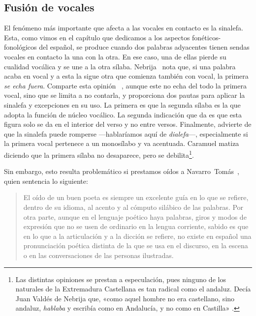 \subsection{Fusión de vocales}
El fenómeno más importante que afecta a las vocales en contacto es la sinalefa. Esta, como vimos en el capítulo que dedicamos a los aspectos fonéticos-fonológicos del español, se produce cuando dos palabras adyacentes tienen sendas vocales en contacto la una con la otra. En ese caso, una de ellas pierde su cualidad vocálica y se une a la otra sílaba. Nebrija~\parencite*[47]{nebrija1981} nota que, si una palabra acaba en vocal y a esta la sigue otra que comienza también con vocal, la primera \textit{se echa fuera}. Comparte esta opinión \citeauthor{diazrengifo2012}~\parencite*[186]{diazrengifo2012}, aunque este no echa del todo la primera vocal, sino que se limita a no contarla, y proporciona dos pautas para aplicar la sinalefa y excepciones en su uso. La primera es que la segunda sílaba es la que adopta la función de núcleo vocálico. La segunda indicación que da es que esta figura solo se da en el interior del verso y no entre versos. Finalmente, advierte de que la sinalefa puede romperse —hablaríamos aquí de \textit{dialefa}—, especialmente si la primera vocal pertenece a un monosílabo y va acentuada. Caramuel \parencite*[51]{caramuel2007} matiza diciendo que la primera sílaba no desaparece, pero se debilita\footnote{Las distintas opiniones se prestan a especulación, pues ninguno de los naturales de la Extremadura Castellana es tan radical como el andaluz. Decía Juan Valdés de Nebrija que, «como aquel hombre no era castellano, sino andaluz, \textit{hablaba} y escribía como en Andalucía, y no como en Castilla» \parencite[p. 190; énfasis añadido; ortografía modernizada]{valdes2015}.}.  

Sin embargo, esto resulta problemático si prestamos oídos a Navarro~Tomás~\parencite*[135]{navarrotomas2004}, quien sentencia lo siguiente: \blockquote{El oído de un buen poeta es siempre un excelente guía en lo que se refiere, dentro de su idioma, al acento y al cómputo silábico de las palabras. Por otra parte, aunque en el lenguaje poético haya palabras, giros y modos de expresión que no se usen de ordinario en la lengua corriente, sabido es que en lo que a la articulación y a la dicción se refiere, no existe en español una pronunciación poética distinta de la que se usa en el discurso, en la escena o en las conversaciones de las personas ilustradas.}

